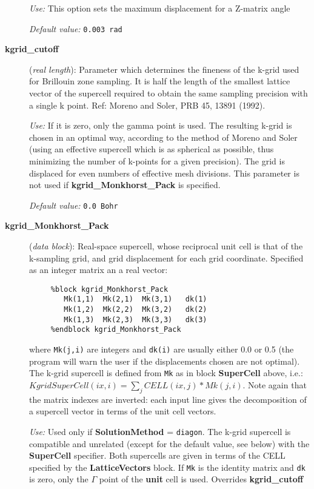 \documentclass[11pt]{article}
\begin{document}
\begin{description}
{\it Use:} This option sets the maximum displacement for a Z-matrix angle

{\it Default value:} {\tt 0.003 rad }



\item[{\bf kgrid\_cutoff}] ({\it real length}): 
Parameter which determines
the fineness of the k-grid used for Brillouin zone sampling.
It is half the length of the smallest lattice vector of the supercell 
required to obtain the same sampling precision with a single k point.
Ref: Moreno and Soler, PRB 45, 13891 (1992).

{\it Use:} If it is zero, only the gamma point is used.
The resulting k-grid is chosen in an optimal way, according to the
method of Moreno and Soler (using an effective supercell which is
as spherical as possible, thus minimizing the number of k-points for
a given precision). The grid is displaced for even numbers of
effective mesh divisions.
This parameter is not used if {\bf kgrid\_Monkhorst\_Pack} is specified.

{\it Default value:} {\tt 0.0 Bohr}
        

\item[{\bf kgrid\_Monkhorst\_Pack}] ({\it data block}): 
Real-space supercell, whose reciprocal unit cell is that of the
k-sampling grid, and grid displacement for each grid coordinate.
Specified as an integer matrix an a real vector:

\begin{verbatim}
     %block kgrid_Monkhorst_Pack
        Mk(1,1)  Mk(2,1)  Mk(3,1)   dk(1) 
        Mk(1,2)  Mk(2,2)  Mk(3,2)   dk(2) 
        Mk(1,3)  Mk(2,3)  Mk(3,3)   dk(3) 
     %endblock kgrid_Monkhorst_Pack 
\end{verbatim}

where {\tt Mk(j,i)} are integers and {\tt dk(i)} are usually
either 0.0 or 0.5 (the program will warn the user if the displacements
chosen are not optimal).
The k-grid supercell is defined from {\tt Mk}
as in block {\bf SuperCell} above, i.e.:
$KgridSuperCell(ix,i) = \sum_j CELL(ix,j)*Mk(j,i)$.
Note again that the matrix indexes are inverted: each input line 
gives the decomposition of a supercell vector in terms of the unit
cell vectors.


{\it Use:} Used only if {\bf SolutionMethod} = {\tt diagon}.
The k-grid supercell is compatible and unrelated 
(except for the default value, see below)
with the {\bf SuperCell} specifier. Both supercells are given in 
terms of the CELL specified by the {\bf LatticeVectors} block.
If {\tt Mk} is the identity matrix and {\tt dk} 
is zero, only the $\Gamma$ point of the {\bf unit} cell is used. 
Overrides {\bf kgrid\_cutoff}


\end{description}
\end{document}
